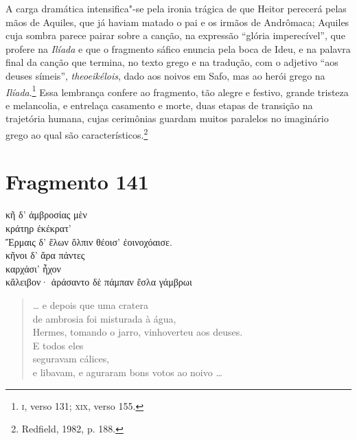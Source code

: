 {A carga dramática intensifica"-se pela ironia trágica de que Heitor perecerá
pelas mãos de Aquiles, que já haviam matado o pai e os irmãos de Andrômaca; Aquiles cuja sombra parece pairar sobre a canção, na expressão ``glória imperecível'', que profere na \textit{Ilíada} e que o fragmento sáfico enuncia pela boca de Ideu, e na palavra final da canção que termina, no texto grego e na tradução, com o adjetivo ``aos deuses símeis'', \textit{theoeikélois}, dado aos noivos em Safo, mas ao herói grego na \textit{Ilíada}.\footnote{\textsc{i}, verso 131; \textsc{xix}, verso 155.}
Essa lembrança confere ao fragmento, tão alegre e festivo, grande tristeza e
melancolia, e entrelaça casamento e morte, duas etapas de transição na trajetória
humana, cujas cerimônias guardam muitos paralelos no imaginário grego ao qual são característicos.\footnote{Redfield, 1982, p. 188.}}



\pagebreak
\section{Fragmento 141}

\begin{gkverse}
κῆ δ’ ἀμβροσίας μὲν\\
κράτηρ ἐκέκρατ’\\
Ἔρμαις δ’ ἔλων ὄλπιν θέοισ’ ἐοινοχόαισε.\\
κῆνοι δ’ ἄρα πάντες\\
καρχάσι’ ἦχον\\
κἄλειβον· ἀράσαντο δὲ πάμπαν ἔσλα γάμβρωι
\end{gkverse}

\begin{verse}
\ldots{} e depois que uma cratera\\
de ambrosia foi misturada à água,\\
Hermes, tomando o jarro, vinhoverteu aos deuses.\\
E todos eles\\
seguravam cálices,\\
e libavam, e aguraram bons votos ao noivo \ldots{}
\end{verse}

\medskip

